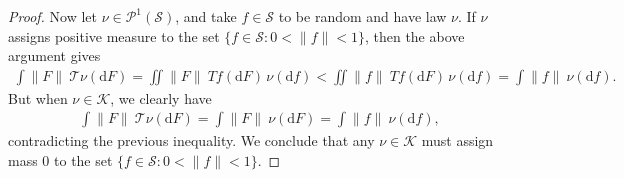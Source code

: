 \documentclass[11pt,reqno]{amsart}
\numberwithin{equation}{section}
\theoremstyle{definition}
\begin{document}
\begin{proof}
Now let $\nu \in {\mathcal{P}}^1({\mathcal{S}})$, and take $f \in {\mathcal{S}}$ to be random and have law $\nu$.
If $\nu$ assigns positive measure to the set $\{f \in {\mathcal{S}} : 0 < \|f\| < 1\}$, then the above argument gives
{\begin{align*} {
\int \|F\|\ {\mathcal{T}}\nu({\mathrm{d}} F) = \iint \|F\|\ Tf({\mathrm{d}} F)\, \nu({\mathrm{d}} f) < \iint \|f\|\ Tf({\mathrm{d}} F)\, \nu({\mathrm{d}} f) = \int \|f\|\ \nu({\mathrm{d}} f).
} \end{align*}}
But when $\nu \in {\mathcal{K}}$, we clearly have
{\begin{align*} {
\int \|F\|\ {\mathcal{T}}\nu({\mathrm{d}} F) = \int \|F\|\ \nu({\mathrm{d}} F) =  \int \|f\|\ \nu({\mathrm{d}} f),
} \end{align*}}
contradicting the previous inequality.
We conclude that any $\nu \in {\mathcal{K}}$ must assign mass 0 to the set $\{f \in {\mathcal{S}} : 0 < \|f\| < 1\}$.
\end{proof}
\end{document}
